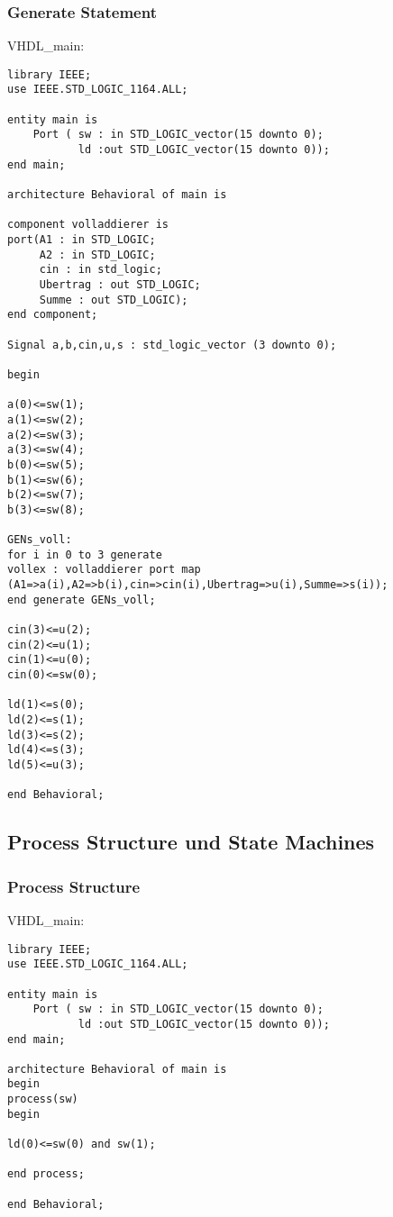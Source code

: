 \documentclass{article}
\begin{document}
\subsubsection{Generate Statement}
VHDL\_main:\newline
\begin{verbatim}
library IEEE;
use IEEE.STD_LOGIC_1164.ALL;

entity main is
    Port ( sw : in STD_LOGIC_vector(15 downto 0);
           ld :out STD_LOGIC_vector(15 downto 0));
end main;

architecture Behavioral of main is

component volladdierer is
port(A1 : in STD_LOGIC;
     A2 : in STD_LOGIC;
     cin : in std_logic;
     Ubertrag : out STD_LOGIC;
     Summe : out STD_LOGIC);
end component;

Signal a,b,cin,u,s : std_logic_vector (3 downto 0);

begin

a(0)<=sw(1);
a(1)<=sw(2);
a(2)<=sw(3);
a(3)<=sw(4);
b(0)<=sw(5);
b(1)<=sw(6);
b(2)<=sw(7);
b(3)<=sw(8);

GENs_voll:
for i in 0 to 3 generate
vollex : volladdierer port map
(A1=>a(i),A2=>b(i),cin=>cin(i),Ubertrag=>u(i),Summe=>s(i));
end generate GENs_voll;

cin(3)<=u(2);
cin(2)<=u(1);
cin(1)<=u(0);
cin(0)<=sw(0);

ld(1)<=s(0);
ld(2)<=s(1);
ld(3)<=s(2);
ld(4)<=s(3);
ld(5)<=u(3);

end Behavioral;
\end{verbatim}

\subsection{Process Structure und State Machines}
\subsubsection{Process Structure}
VHDL\_main:\newline
\begin{verbatim}
library IEEE;
use IEEE.STD_LOGIC_1164.ALL;

entity main is
    Port ( sw : in STD_LOGIC_vector(15 downto 0);
           ld :out STD_LOGIC_vector(15 downto 0));
end main;

architecture Behavioral of main is
begin
process(sw)
begin

ld(0)<=sw(0) and sw(1);

end process;

end Behavioral;
\end{verbatim}
\end{document}
